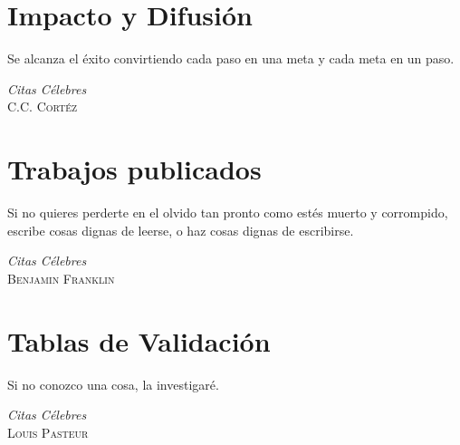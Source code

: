 \documentclass[a4paper,final,11pt,fleqn,twoside]{book}  %
\begin{document}
\chapter{\label{capitulo:impacto}Impacto y Difusión}\label{impacto}
\epigraph{Se alcanza el éxito convirtiendo cada paso en una meta y cada meta en un paso.}
{\textit{Citas Célebres}\\ \textsc{C.C. Cortéz}}

\chapter{\label{capitulo:publicaciones}Trabajos publicados}
\epigraph{Si no quieres perderte en el olvido tan pronto como estés muerto y corrompido, \\ escribe cosas dignas de leerse, o haz cosas dignas de escribirse.}
{\textit{Citas Célebres}\\ \textsc{Benjamin Franklin}}

\chapter{\label{capitulo:tablas}Tablas de Validación}\label{tablas-validacion-apen}
\epigraph{Si no conozco una cosa, la investigaré.}
{\textit{Citas Célebres}\\ \textsc{Louis Pasteur}}

% 
% 
% 
% 
% 
% 


\backmatter


\printindex
\printglossaries


\insertbibliography
\end{document}
